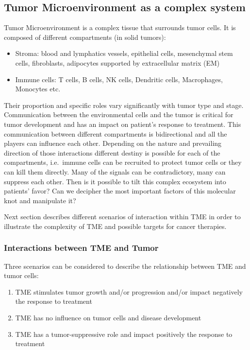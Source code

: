 \documentclass[12pt,]{book}
\providecommand{\tightlist}{%
  \setlength{\itemsep}{0pt}\setlength{\parskip}{0pt}}
\theoremstyle{definition}
\theoremstyle{definition}
\theoremstyle{definition}
\theoremstyle{remark}
\begin{document}
\hypertarget{tumor-microenvironment-as-a-complex-system}{%
\subsection{Tumor Microenvironment as a complex
system}\label{tumor-microenvironment-as-a-complex-system}}

Tumor Microenvironment is a complex tissue that surrounds tumor cells.
It is composed of different compartments (in solid tumors):

\begin{itemize}
\tightlist
\item
  Stroma: blood and lymphatics vessels, epithelial cells, mesenchymal
  stem cells, fibroblasts, adipocytes supported by extracellular matrix
  (EM)
\item
  Immune cells: T cells, B cells, NK cells, Dendritic cells,
  Macrophages, Monocytes etc.
\end{itemize}

Their proportion and specific roles vary significantly with tumor type
and stage. Communication between the environmental cells and the tumor
is critical for tumor development and has an impact on patient's
response to treatment. This communication between different compartments
is bidirectional and all the players can influence each other. Depending
on the nature and prevailing direction of those interactions different
destiny is possible for each of the compartments, i.e.~immune cells can
be recruited to protect tumor cells or they can kill them directly. Many
of the signals can be contradictory, many can suppress each other. Then
is it possible to tilt this complex ecosystem into patients' favor? Can
we decipher the most important factors of this molecular knot and
manipulate it?

Next section describes different scenarios of interaction within TME in
order to illustrate the complexity of TME and possible targets for
cancer therapies.

\hypertarget{interactions-between-tme-and-tumor}{%
\subsubsection{Interactions between TME and
Tumor}\label{interactions-between-tme-and-tumor}}

Three scenarios can be considered to describe the relationship between
TME and tumor cells:

\begin{enumerate}
\def\labelenumi{\arabic{enumi}.}
\tightlist
\item
  TME stimulates tumor growth and/or progression and/or impact
  negatively the response to treatment
\item
  TME has no influence on tumor cells and disease development
\item
  TME has a tumor-suppressive role and impact positively the response to
  treatment
\end{enumerate}
\end{document}
